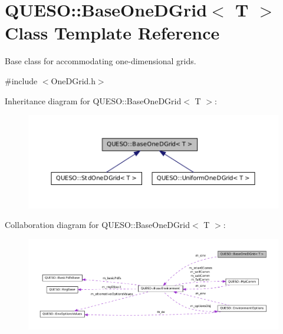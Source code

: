 \hypertarget{class_q_u_e_s_o_1_1_base_one_d_grid}{\section{Q\-U\-E\-S\-O\-:\-:Base\-One\-D\-Grid$<$ T $>$ Class Template Reference}
\label{class_q_u_e_s_o_1_1_base_one_d_grid}
}


Base class for accommodating one-\/dimensional grids.  




{\ttfamily \#include $<$One\-D\-Grid.\-h$>$}



Inheritance diagram for Q\-U\-E\-S\-O\-:\-:Base\-One\-D\-Grid$<$ T $>$\-:
\nopagebreak
\begin{figure}[H]
\begin{center}
\leavevmode
\includegraphics[width=350pt]{class_q_u_e_s_o_1_1_base_one_d_grid__inherit__graph}
\end{center}
\end{figure}


Collaboration diagram for Q\-U\-E\-S\-O\-:\-:Base\-One\-D\-Grid$<$ T $>$\-:
\nopagebreak
\begin{figure}[H]
\begin{center}
\leavevmode
\includegraphics[width=350pt]{class_q_u_e_s_o_1_1_base_one_d_grid__coll__graph}
\end{center}
\end{figure}
